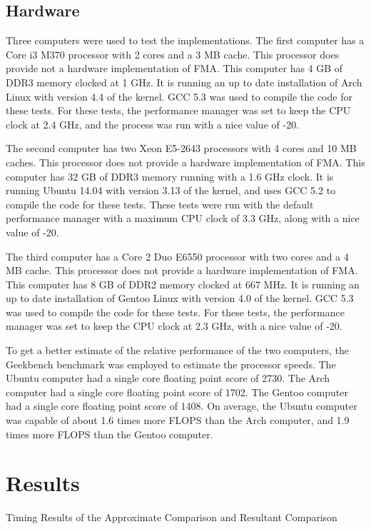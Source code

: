 \documentclass{cccg16}
\begin{document}
\subsection{Hardware}
Three computers were used to test the implementations.  The first
computer has a Core i3 M370 processor with 2 cores and a 3 MB cache.
This processor does provide not a hardware implementation of FMA.
This computer has 4 GB of DDR3 memory clocked at 1 GHz.  It is running
an up to date installation of Arch Linux with version 4.4 of the
kernel.  GCC 5.3 was used to compile the code for these tests.  For
these tests, the performance manager was set to keep the CPU clock at
2.4 GHz, and the process was run with a nice value of -20.

The second computer has two Xeon E5-2643 processors with 4 cores and
10 MB caches.  This processor does not provide a hardware
implementation of FMA.  This computer has 32 GB of DDR3 memory running
with a 1.6 GHz clock.  It is running Ubuntu 14.04 with version 3.13 of
the kernel, and uses GCC 5.2 to compile the code for these tests.
These tests were run with the default performance manager with a
maximum CPU clock of 3.3 GHz, along with a nice value of -20.

The third computer has a Core 2 Duo E6550 processor with two cores and
a 4 MB cache.  This processor does not provide a hardware
implementation of FMA.  This computer has 8 GB of DDR2 memory clocked
at 667 MHz.  It is running an up to date installation of Gentoo Linux
with version 4.0 of the kernel.  GCC 5.3 was used to compile the code
for these tests.  For these tests, the performance manager was set to
keep the CPU clock at 2.3 GHz, with a nice value of -20.

To get a better estimate of the relative performance of the two
computers, the Geekbench benchmark was employed to estimate the
processor speeds.  The Ubuntu computer had a single core floating
point score of 2730.  The Arch computer had a single core floating
point score of 1702.  The Gentoo computer had a single core floating
point score of 1408.  On average, the Ubuntu computer was capable of
about 1.6 times more FLOPS than the Arch computer, and 1.9 times more
FLOPS than the Gentoo computer.

\section{Results}

\begin{table}[p]
  \caption{Timing Results of the Approximate Comparison and Resultant Comparison}
  \label{tab:times}
  \centering{
    
  }
\end{table}
\end{document}
